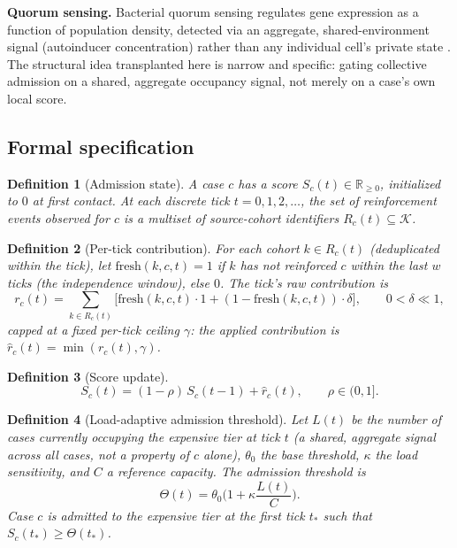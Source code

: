 \documentclass[11pt]{article}
\newtheorem{definition}{Definition}
\begin{document}
\textbf{Quorum sensing.} Bacterial quorum sensing regulates gene expression as a
function of population density, detected via an aggregate, shared-environment signal
(autoinducer concentration) rather than any individual cell's private state
\cite{miller2001}. The structural idea transplanted here is narrow and specific: gating
collective admission on a shared, aggregate occupancy signal, not merely on a
case's own local score.

\subsection{Formal specification}

\begin{definition}[Admission state]
A case $c$ has a score $S_c(t) \in \mathbb{R}_{\geq 0}$, initialized to $0$ at first
contact. At each discrete tick $t = 0, 1, 2, \dots$, the set of reinforcement events
observed for $c$ is a multiset of source-cohort identifiers
$R_c(t) \subseteq \mathcal{K}$.
\end{definition}

\begin{definition}[Per-tick contribution]
For each cohort $k \in R_c(t)$ (deduplicated within the tick), let
$\mathrm{fresh}(k,c,t) = 1$ if $k$ has not reinforced $c$ within the last $w$ ticks
(the independence window), else $0$. The tick's raw contribution is
\[
r_c(t) = \sum_{k \in R_c(t)} \big[ \mathrm{fresh}(k,c,t)\cdot 1 + (1-\mathrm{fresh}(k,c,t))\cdot \delta \big],
\qquad 0 < \delta \ll 1,
\]
capped at a fixed per-tick ceiling $\gamma$: the applied contribution is
$\hat r_c(t) = \min(r_c(t), \gamma)$.
\end{definition}

\begin{definition}[Score update]
\[
S_c(t) = (1-\rho)\, S_c(t-1) + \hat r_c(t), \qquad \rho \in (0,1].
\]
\end{definition}

\begin{definition}[Load-adaptive admission threshold]
Let $L(t)$ be the number of cases currently occupying the expensive tier at tick $t$
(a shared, aggregate signal across all cases, not a property of $c$ alone), $\theta_0$
the base threshold, $\kappa$ the load sensitivity, and $C$ a reference capacity. The
admission threshold is
\[
\Theta(t) = \theta_0 \Big(1 + \kappa \frac{L(t)}{C}\Big).
\]
Case $c$ is admitted to the expensive tier at the first tick $t_{\ast}$ such that
$S_c(t_{\ast}) \geq \Theta(t_{\ast})$.
\end{definition}
\end{document}
